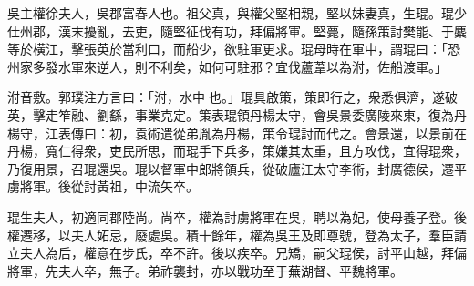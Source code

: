 
\begin{pinyinscope}
吳主權徐夫人，吳郡富春人也。祖父真，與權父堅相親，堅以妹妻真，生琨。琨少仕州郡，漢末擾亂，去吏，隨堅征伐有功，拜偏將軍。堅薨，隨孫策討樊能、于麋等於橫江，擊張英於當利口，而船少，欲駐軍更求。琨母時在軍中，謂琨曰：「恐州家多發水軍來逆人，則不利矣，如何可駐邪？宜伐蘆葦以為泭，佐船渡軍。」

泭音敷。郭璞注方言曰：「泭，水中𥱼也。」琨具啟策，策即行之，衆悉俱濟，遂破英，擊走笮融、劉繇，事業克定。策表琨領丹楊太守，會吳景委廣陵來東，復為丹楊守，江表傳曰：初，袁術遣從弟胤為丹楊，策令琨討而代之。會景還，以景前在丹楊，寬仁得衆，吏民所思，而琨手下兵多，策嫌其太重，且方攻伐，宜得琨衆，乃復用景，召琨還吳。琨以督軍中郎將領兵，從破廬江太守李術，封廣德侯，遷平虜將軍。後從討黃祖，中流矢卒。

琨生夫人，初適同郡陸尚。尚卒，權為討虜將軍在吳，聘以為妃，使母養子登。後權遷移，以夫人妬忌，廢處吳。積十餘年，權為吳王及即尊號，登為太子，羣臣請立夫人為后，權意在步氏，卒不許。後以疾卒。兄矯，嗣父琨侯，討平山越，拜偏將軍，先夫人卒，無子。弟祚襲封，亦以戰功至于蕪湖督、平魏將軍。


\end{pinyinscope}